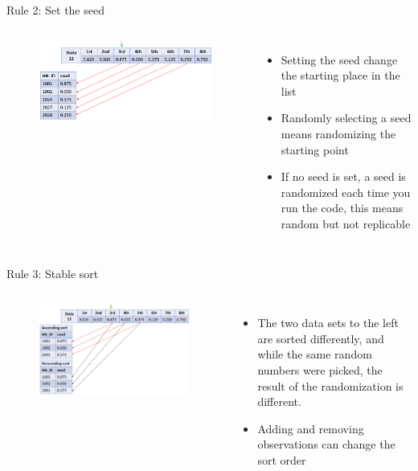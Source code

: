 \documentclass[aspectratio=169]{beamer}
\begin{document}
\begin{frame}{Rule 2: Set the seed}
	\begin{columns}[c]
		\begin{figure}
			\centering
			\includegraphics[width=\linewidth]{img/rule2}
		\end{figure}
		\begin{itemize}
			\item \small Setting the seed change the starting place in the list
			\item \small Randomly selecting a seed means randomizing the starting point
			\item \small If no seed is set, a seed is randomized each time you run the code, this means random but not replicable
		\end{itemize}
	\end{columns}
\end{frame}


\begin{frame}{Rule 3: Stable sort}	
	\begin{columns}[c]
		\begin{figure}
			\centering
			\includegraphics[width=\linewidth]{img/rule3}
		\end{figure}
		\begin{itemize}
			\item \small The two data sets to the left are sorted differently, and while the same random numbers were picked, the result of the randomization is different.
			\item \small Adding and removing observations can change the sort order
		\end{itemize}
	\end{columns}
\end{frame}
\end{document}

